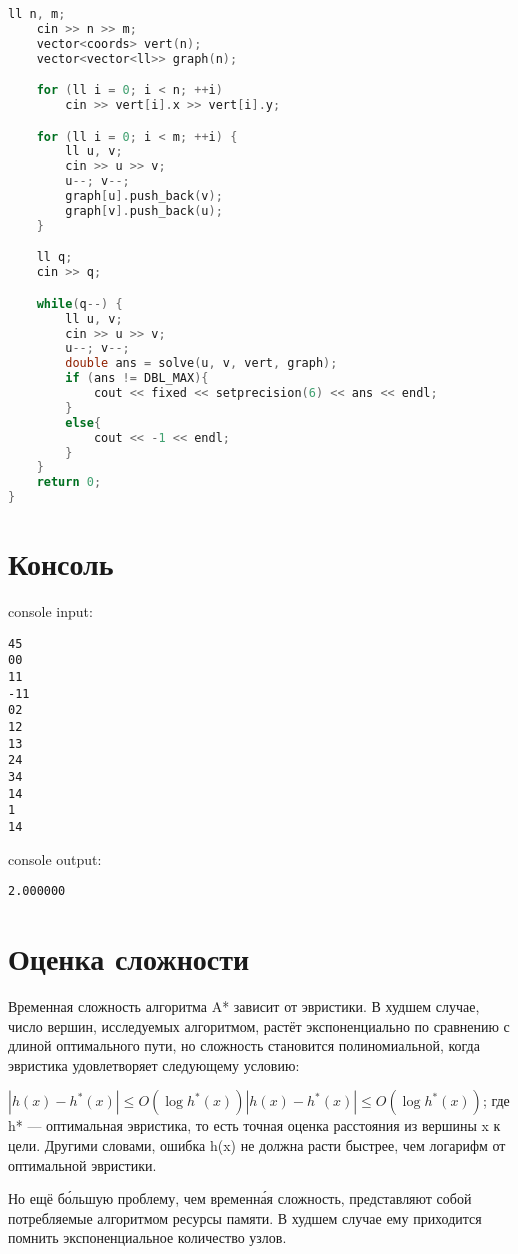 \begin{lstlisting}[language=C++]
    ll n, m;
    cin >> n >> m;
    vector<coords> vert(n);
    vector<vector<ll>> graph(n);

    for (ll i = 0; i < n; ++i)
        cin >> vert[i].x >> vert[i].y;

    for (ll i = 0; i < m; ++i) {
        ll u, v;
        cin >> u >> v;
        u--; v--;
        graph[u].push_back(v);
        graph[v].push_back(u);
    }

    ll q;
    cin >> q;

    while(q--) {
        ll u, v;
        cin >> u >> v;
        u--; v--;
        double ans = solve(u, v, vert, graph);
        if (ans != DBL_MAX){
            cout << fixed << setprecision(6) << ans << endl;
        }
        else{
            cout << -1 << endl;
        }
    }
    return 0;
}
\end{lstlisting}

\section{Консоль}
console input:
\begin{alltt}
4 5
0 0
1 1
-1 1
0 2
1 2
1 3
2 4
3 4
1 4
1
1 4

\end{alltt}
console output:
\begin{alltt}
2.000000
\end{alltt}
\pagebreak

\section{Оценка сложности}
Временная сложность алгоритма A* зависит от эвристики. В худшем случае, число вершин, исследуемых алгоритмом, растёт экспоненциально по сравнению с длиной оптимального пути, но сложность становится полиномиальной, когда эвристика удовлетворяет следующему условию:\newline

${\displaystyle |h(x)-h^{*}(x)|\leq O(\log h^{*}(x))}|h(x)-h^{*}(x)|\leq O(\log h^{*}(x))$;\newline
где h* — оптимальная эвристика, то есть точная оценка расстояния из вершины x к цели. Другими словами, ошибка h(x) не должна расти быстрее, чем логарифм от оптимальной эвристики.\newline

Но ещё бо́льшую проблему, чем временна́я сложность, представляют собой потребляемые алгоритмом ресурсы памяти. В худшем случае ему приходится помнить экспоненциальное количество узлов. \newline

\pagebreak